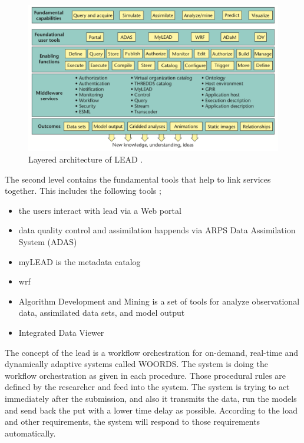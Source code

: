 \begin{figure}[htp]
    \centering
    \includegraphics[width=1.0\textwidth]{lit/lead/LEAD-system-Fundamental-capabilities-familiar-to-meteorologists-are-shown-in-the-top_W640.png}
    \caption[Layered architecture of LEAD]{Layered architecture of LEAD \cite{Droegemeier2005Service-OrientedWeather}.}
    \label{fi:lead_system}
\end{figure}

The second level contains the fundamental tools that help to link services together. This includes the following tools \cite{Droegemeier2005Service-OrientedWeather};
\begin{itemize}
    \item the users interact with \acrshort{lead} via a Web portal
    \item data quality control and assimilation happends via ARPS Data Assimilation System (ADAS)
    \item myLEAD is the metadata catalog
    \item \acrfull{wrf} \cite{MesoscaleMicroscaleMeteorologyLaboratoryWeatherModel}
    \item Algorithm Development and Mining is a set of tools for analyze observational data, assimilated data sets, and model output 
    \item Integrated Data Viewer 
\end{itemize}

The concept of the \acrshort{lead} is a workflow orchestration for on-demand, real-time and dynamically adaptive systems called WOORDS. The system is doing the workflow orchestration as given in each procedure. Those procedural rules are defined by the researcher and feed into the system. The system is trying to act immediately after the submission, and also it transmits the data, run the models and send back the put with a lower time delay as possible. According to the load and other requirements, the system will respond to those requirements automatically.

